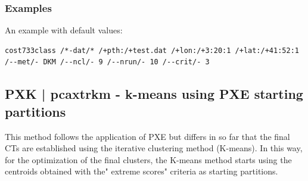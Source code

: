 \documentclass[12pt, oneside, a4paper, headsepline, plainheadsepline]{scrbook}
\begin{document}
\subsubsection*{Examples}
An example with default values:
\begin{lstlisting}
cost733class /*-dat/* /+pth:/+test.dat /+lon:/+3:20:1 /+lat:/+41:52:1 /--met/- DKM /--ncl/- 9 /--nrun/- 10 /--crit/- 3
\end{lstlisting}
\subsection{PXK | pcaxtrkm - k-means using PXE starting partitions}

This method follows the application of PXE but differs in so far that the final CTs are established using the iterative clustering method (K-means). In this way, for the optimization of the final clusters, the K-means method starts using the centroids obtained with the" extreme scores" criteria as starting partitions.
\end{document}
